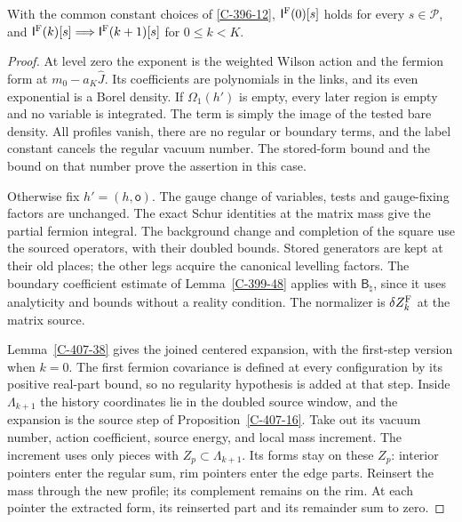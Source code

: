 \documentclass[11pt,letterpaper,reqno]{amsart}
\makeatletter
\theoremstyle{definition}
\newcommand{\ms@minorstart}{%
  \pushQED{\qed}\renewcommand{\qedsymbol}{$\blacksquare$}}
\newenvironment{proposition}[1][]{\ms@minorstart\ms@proposition[#1]}
  {\popQED\endms@proposition}
\theoremstyle{remark}
\makeatother
\begin{document}
\begin{proposition}[Induction at a complex source]\label{C-407-37}
With the common constant choices of \cref{C-396-12},
$\mathsf I^{\rm F}(0)[s]$ holds for
every $s\in\mathcal P$, and
$\mathsf I^{\rm F}(k)[s]\Longrightarrow
\mathsf I^{\rm F}(k+1)[s]$ for $0\le k<K$.
\end{proposition}
\begin{proof}
At level zero the exponent is the weighted Wilson action and
the fermion form at $m_0-a_K\widehat J$. Its coefficients are
polynomials in the links, and its even exponential is a Borel
density. If $\Omega_1(h')$ is empty, every later region is empty
and no variable is integrated. The term is simply the image of
the tested bare density. All profiles vanish, there are no
regular or boundary terms, and the label constant cancels the
regular vacuum number. The stored-form bound and the bound on
that number prove the assertion in this case.

Otherwise fix $h'=(h,\mathsf o)$. The gauge change of variables,
tests and gauge-fixing factors are unchanged. The exact Schur
identities at the matrix mass give the partial fermion integral.
The background change and completion of the square use the
sourced operators, with their doubled bounds. Stored generators
are kept at their old places; the other legs acquire the
canonical levelling factors. The boundary coefficient estimate
of Lemma~\ref{C-399-48} applies with $\mathsf B_\natural$,
since it uses analyticity and bounds without a reality condition.
The normalizer is $\delta Z_k^{\rm F}$ at the matrix source.

Lemma~\ref{C-407-38} gives the joined centered expansion, with
the first-step version when $k=0$. The first fermion covariance
is defined at every configuration by its positive real-part
bound, so no regularity hypothesis is added at that step.
Inside $\Lambda_{k+1}$ the history coordinates lie in the
doubled source window, and the expansion is the source step of
Proposition~\ref{C-407-16}. Take out its vacuum number, action
coefficient, source energy, and local mass increment. The
increment uses only pieces with $Z_p\subset\Lambda_{k+1}$.
Its forms stay on these $Z_p$: interior pointers enter the
regular sum, rim pointers enter the edge parts. Reinsert the
mass through the new profile; its complement remains on the
rim. At each pointer the extracted form, its reinserted part
and its remainder sum to zero.


\end{proof}
\end{document}
